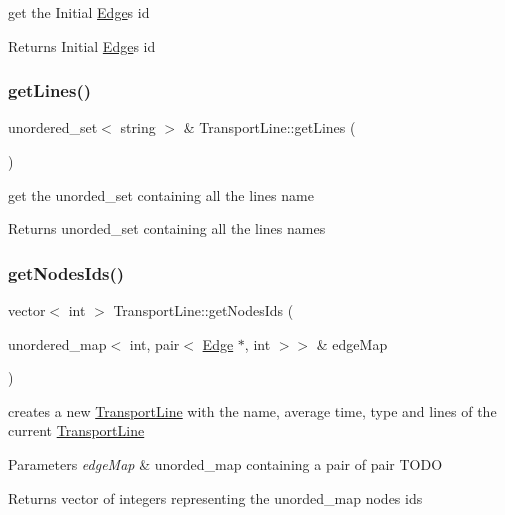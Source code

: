 get the Initial \hyperlink{class_edge}{Edge}\textquotesingle{}s id 

\begin{DoxyReturn}{Returns}
Initial \hyperlink{class_edge}{Edge}\textquotesingle{}s id 
\end{DoxyReturn}
\mbox{\label{class_transport_line_aef5df58c623344ea1d98b0f12fa2ca25}} 
\subsubsection{\texorpdfstring{get\+Lines()}{getLines()}}
{\footnotesize\ttfamily unordered\+\_\+set$<$ string $>$ \& Transport\+Line\+::get\+Lines (\begin{DoxyParamCaption}{ }\end{DoxyParamCaption})}



get the unorded\+\_\+set containing all the lines name 

\begin{DoxyReturn}{Returns}
unorded\+\_\+set containing all the lines names 
\end{DoxyReturn}
\mbox{\label{class_transport_line_a290cb29505345846dac71ba711e6442c}} 
\subsubsection{\texorpdfstring{get\+Nodes\+Ids()}{getNodesIds()}}
{\footnotesize\ttfamily vector$<$ int $>$ Transport\+Line\+::get\+Nodes\+Ids (\begin{DoxyParamCaption}\item[{unordered\+\_\+map$<$ int, pair$<$ \hyperlink{class_edge}{Edge} $\ast$, int $>$$>$ \&}]{edge\+Map }\end{DoxyParamCaption})}



creates a new \hyperlink{class_transport_line}{Transport\+Line} with the name, average time, type and lines of the current \hyperlink{class_transport_line}{Transport\+Line} 


\begin{DoxyParams}{Parameters}
{\em edge\+Map} & unorded\+\_\+map containing a pair of pair T\+O\+DO \\
\hline
\end{DoxyParams}
\begin{DoxyReturn}{Returns}
vector of integers representing the unorded\+\_\+map nodes\textquotesingle{} ids 
\end{DoxyReturn}
\mbox{\label{class_transport_line_a0ef38c2c635d278c44aeb88ce6a68d31}} 
